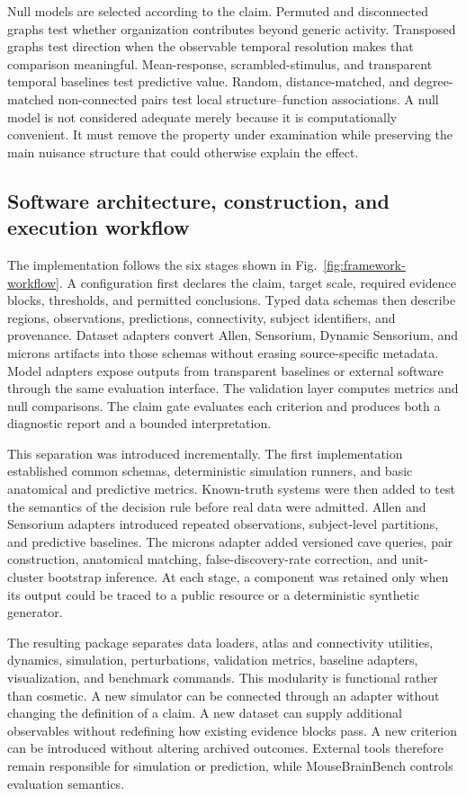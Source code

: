 Null models are selected according to the claim. Permuted and disconnected
graphs test whether organization contributes beyond generic activity.
Transposed graphs test direction when the observable temporal resolution makes
that comparison meaningful. Mean-response, scrambled-stimulus, and transparent
temporal baselines test predictive value. Random, distance-matched, and
degree-matched non-connected pairs test local structure--function associations.
A null model is not considered adequate merely because it is computationally
convenient. It must remove the property under examination while preserving the
main nuisance structure that could otherwise explain the effect.

\subsection{Software architecture, construction, and execution workflow}
\label{subsec:software-workflow}

The implementation follows the six stages shown in
Fig.~\ref{fig:framework-workflow}. A configuration first declares the claim,
target scale, required evidence blocks, thresholds, and permitted conclusions.
Typed data schemas then describe regions, observations, predictions,
connectivity, subject identifiers, and provenance. Dataset adapters convert
Allen, Sensorium, Dynamic Sensorium, and \acs{microns} artifacts into those schemas
without erasing source-specific metadata. Model adapters expose outputs from
transparent baselines or external software through the same evaluation
interface. The validation layer computes metrics and null comparisons. The
claim gate evaluates each criterion and produces both a diagnostic report and a
bounded interpretation.

This separation was introduced incrementally. The first implementation
established common schemas, deterministic simulation runners, and basic
anatomical and predictive metrics. Known-truth systems were then added to test
the semantics of the decision rule before real data were admitted. Allen and
Sensorium adapters introduced repeated observations, subject-level partitions,
and predictive baselines. The \acs{microns} adapter added versioned \acs{cave} queries,
pair construction, anatomical matching, false-discovery-rate correction, and
unit-cluster bootstrap inference. At each stage, a component was retained only
when its output could be traced to a public resource or a deterministic
synthetic generator.

The resulting package separates data loaders, atlas and connectivity utilities,
dynamics, simulation, perturbations, validation metrics, baseline adapters,
visualization, and benchmark commands. This modularity is functional rather
than cosmetic. A new simulator can be connected through an adapter without
changing the definition of a claim. A new dataset can supply additional
observables without redefining how existing evidence blocks pass. A new
criterion can be introduced without altering archived outcomes. External tools
therefore remain responsible for simulation or prediction, while
MouseBrainBench controls evaluation semantics.

